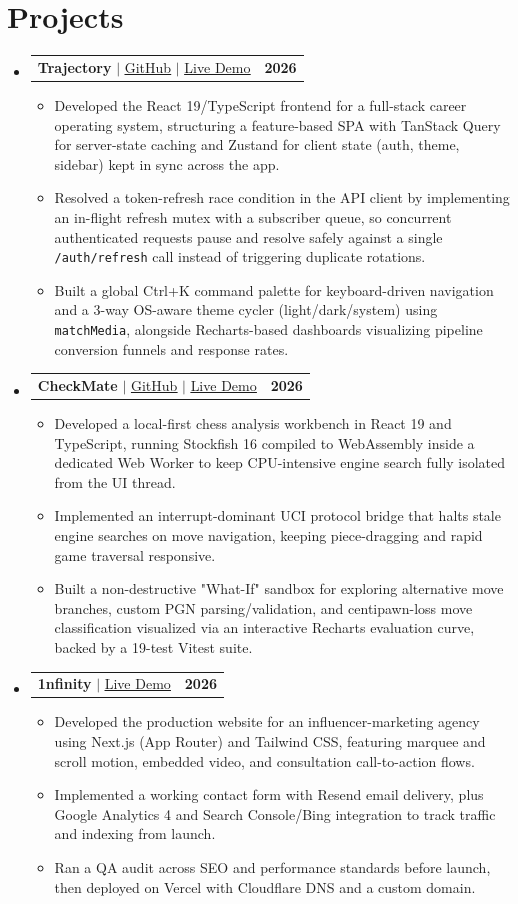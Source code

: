 \documentclass[letterpaper,10pt]{article}
\makeatletter
\newcommand{\resumeItem}[1]{
  \item\small{
    {#1 \vspace{-2pt}}
  }
}
\newcommand{\resumeProjectHeading}[2]{
    \item
    \begin{tabular*}{1.001\textwidth}{l@{\extracolsep{\fill}}r}
      \small#1 & \textbf{\small #2}\\
    \end{tabular*}\vspace{-7pt}
}
\newcommand{\resumeSubHeadingListStart}{\begin{itemize}[leftmargin=0.0in, label={}]}
\newcommand{\resumeSubHeadingListEnd}{\end{itemize}}
\newcommand{\resumeItemListStart}{\begin{itemize}}
\newcommand{\resumeItemListEnd}{\end{itemize}\vspace{-5pt}}
\makeatother
\begin{document}
\section{Projects}
    \vspace{-5pt}
    \resumeSubHeadingListStart
\resumeProjectHeading
    {\textbf{Trajectory} $|$ \href{https://github.com/vaibhv19/trajectory}{\underline{GitHub}} $|$ \href{https://trajectory.vaibhv19.dev}{\underline{Live Demo}}}{2026}
    \resumeItemListStart
        \resumeItem{Developed the React 19/TypeScript frontend for a full-stack career operating system, structuring a feature-based SPA with TanStack Query for server-state caching and Zustand for client state (auth, theme, sidebar) kept in sync across the app.}
        \resumeItem{Resolved a token-refresh race condition in the API client by implementing an in-flight refresh mutex with a subscriber queue, so concurrent authenticated requests pause and resolve safely against a single \texttt{/auth/refresh} call instead of triggering duplicate rotations.}
        \resumeItem{Built a global Ctrl+K command palette for keyboard-driven navigation and a 3-way OS-aware theme cycler (light/dark/system) using \texttt{matchMedia}, alongside Recharts-based dashboards visualizing pipeline conversion funnels and response rates.}
    \resumeItemListEnd
          \vspace{-13pt}
\resumeProjectHeading
    {\textbf{CheckMate} $|$ \href{https://github.com/vaibhv19/Check-Mate-Analyse}{\underline{GitHub}} $|$ \href{https://checkmate.vaibhv19.dev}{\underline{Live Demo}}}{2026}
    \resumeItemListStart
        \resumeItem{Developed a local-first chess analysis workbench in React 19 and TypeScript, running Stockfish 16 compiled to WebAssembly inside a dedicated Web Worker to keep CPU-intensive engine search fully isolated from the UI thread.}
        \resumeItem{Implemented an interrupt-dominant UCI protocol bridge that halts stale engine searches on move navigation, keeping piece-dragging and rapid game traversal responsive.}
        \resumeItem{Built a non-destructive "What-If" sandbox for exploring alternative move branches, custom PGN parsing/validation, and centipawn-loss move classification visualized via an interactive Recharts evaluation curve, backed by a 19-test Vitest suite.}
    \resumeItemListEnd
          \vspace{-13pt}
\resumeProjectHeading
    {\textbf{1nfinity} $|$ \href{https://1nfinity.online}{\underline{Live Demo}}}{2026}
    \resumeItemListStart
        \resumeItem{Developed the production website for an influencer-marketing agency using Next.js (App Router) and Tailwind CSS, featuring marquee and scroll motion, embedded video, and consultation call-to-action flows.}
        \resumeItem{Implemented a working contact form with Resend email delivery, plus Google Analytics 4 and Search Console/Bing integration to track traffic and indexing from launch.}
        \resumeItem{Ran a QA audit across SEO and performance standards before launch, then deployed on Vercel with Cloudflare DNS and a custom domain.}
    \resumeItemListEnd
    \resumeSubHeadingListEnd
\vspace{-12pt}
\end{document}
